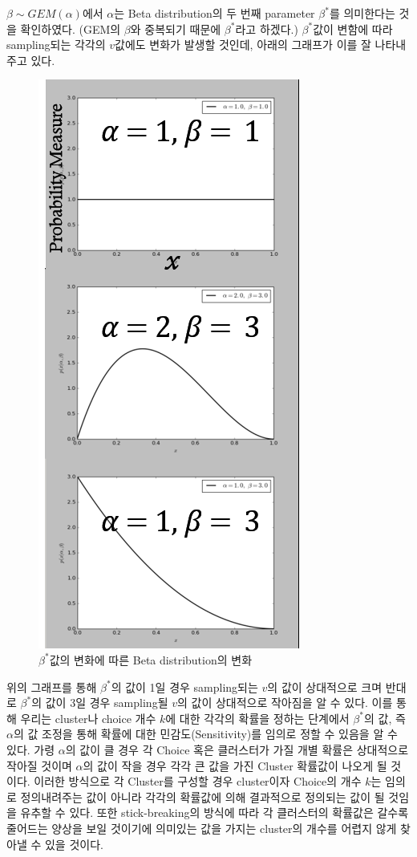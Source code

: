 \documentclass[a4paper]{oblivoir}
\begin{document}
$\beta \sim GEM(\alpha)$에서 $\alpha$는 Beta distribution의 두 번째 parameter $\beta^{*}$를 의미한다는 것을 확인하였다. (GEM의 $\beta$와 중복되기 때문에 $\beta^{*}$라고 하겠다.) $\beta^{*}$값이 변함에 따라 sampling되는 각각의 $v$값에도 변화가 발생할 것인데, 아래의 그래프가 이를 잘 나타내주고 있다. \\
\begin{figure}[ht] \centering 
\includegraphics[scale=0.7]{fig13_4.png} 
\caption{$\beta^{*}$값의 변화에 따른 Beta distribution의 변화}
\label{fig:13-4}
\end{figure}

위의 그래프를 통해 $\beta^{*}$의 값이 1일 경우 sampling되는 $v$의 값이 상대적으로 크며 반대로 $\beta^{*}$의 값이 3일 경우 sampling될 $v$의 값이 상대적으로 작아짐을 알 수 있다. 이를 통해 우리는 cluster나 choice 개수 $k$에 대한 각각의 확률을 정하는 단계에서 $\beta^{*}$의 값, 즉 $\alpha$의 값 조정을 통해 확률에 대한 민감도(Sensitivity)를 임의로 정할 수 있음을 알 수 있다. 가령 $\alpha$의 값이 클 경우 각 Choice 혹은 클러스터가 가질 개별 확률은 상대적으로 작아질 것이며 $\alpha$의 값이 작을 경우 각각 큰 값을 가진 Cluster 확률값이 나오게 될 것이다. 이러한 방식으로 각 Cluster를 구성할 경우 cluster이자 Choice의 개수 $k$는 임의로 정의내려주는 값이 아니라 각각의 확률값에 의해 결과적으로 정의되는 값이 될 것임을 유추할 수 있다. 또한 stick-breaking의 방식에 따라 각 클러스터의 확률값은 갈수록 줄어드는 양상을 보일 것이기에 의미있는 값을 가지는 cluster의 개수를 어렵지 않게 찾아낼 수 있을 것이다.
\end{document}
